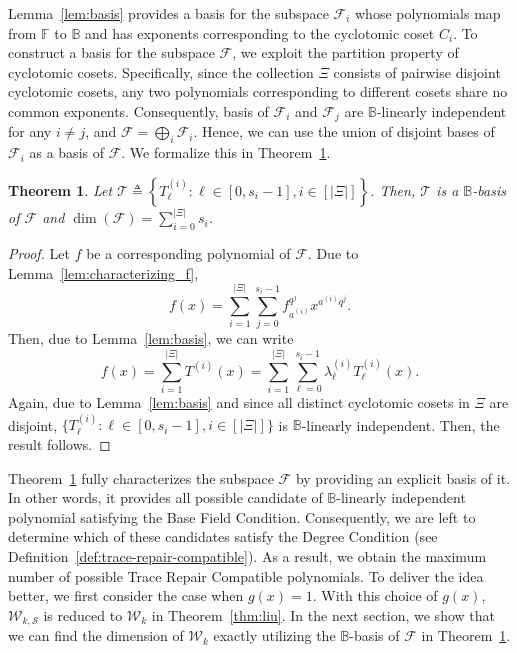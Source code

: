 \documentclass[onecolumn]{IEEEtran}
\theoremstyle{plain}
\newtheorem{theorem}{Theorem}
\theoremstyle{definition}
\newcommand{\FF}{\mathbb{F}}
\newcommand{\BB}{\mathbb{B}}
\newcommand{\cS}{\mathcal{S}}
\newcommand{\cF}{\mathcal{F}}
\newcommand{\cT}{\mathcal{T}}
\newcommand{\cW}{\mathcal{W}}
\newcommand{\kim}[1]{{\color{blue} Kim:#1}}
\begin{document}
Lemma~\ref{lem:basis} provides a basis for the subspace $\cF_i$ whose polynomials map from $\FF$ to $\BB$ and has exponents corresponding to the cyclotomic coset $C_i$. To construct a basis for the subspace $\cF$, we exploit the partition property of cyclotomic cosets. Specifically, since the collection $\Xi$ consists of pairwise disjoint cyclotomic cosets, any two polynomials corresponding to different cosets share no common exponents. Consequently, basis of $\cF_i$ and $\cF_j$ are $\BB$-linearly independent for any $i\ne j$, and $\cF = \bigoplus_i \cF_i$. Hence, we can use the union of disjoint bases of $\cF_i$ as a basis of $\cF$. We formalize this in Theorem~\ref{thm:dim_of_F}.

\begin{theorem}\label{thm:dim_of_F}
    Let $\cT\triangleq \left\{T_{\ell}^{(i)}:\ell\in[0,s_i-1], i\in[|\Xi|]\right\}$. Then, $\cT$ is a $\BB$-basis of $\cF$ and $\dim(\cF) = \sum_{i=0}^{|\Xi|} s_i$.
\end{theorem}
\begin{proof}
     Let $f$ be a corresponding polynomial of $\cF$. Due to Lemma~\ref{lem:characterizing_f},
    $$
    f(x) = \sum_{i=1}^{|\Xi|}\sum_{j=0}^{s_i-1}f_{a^{(i)}}^{q^j}x^{a^{(i)}q^j}.
    $$
Then, due to Lemma~\ref{lem:basis}, we can write
$$
f(x) = \sum_{i=1}^{|\Xi|}T^{(i)}(x) = \sum_{i=1}^{|\Xi|}\sum_{\ell=0}^{s_i-1} \lambda_\ell^{(i)} T_{\ell}^{(i)}(x).
$$
Again, due to Lemma~\ref{lem:basis} and since all distinct cyclotomic cosets in $\Xi$ are disjoint, $\{T_\ell^{(i)}:\ell\in[0,s_i-1],i\in[|\Xi|]\}$ is $\BB$-linearly independent. Then, the result follows.
\end{proof}
Theorem~\ref{thm:dim_of_F} fully characterizes the subspace $\cF$ by providing an explicit basis of it. In other words, it provides all possible candidate of $\BB$-linearly independent polynomial satisfying the Base Field Condition. Consequently, we are left to determine which of these candidates satisfy the Degree Condition (see Definition~\ref{def:trace-repair-compatible}). As a result, we obtain the maximum number of possible Trace Repair Compatible polynomials. To deliver the idea better, we first consider the case when $g(x) = 1$. With this choice of $g(x)$, $\cW_{k,\cS}$ is reduced to $\cW_k$ in Theorem~\ref{thm:liu}. In the next section, we show that we can find the dimension of $\cW_k$ exactly utilizing the $\BB$-basis of $\cF$ in Theorem~\ref{thm:dim_of_F}.
\end{document}
